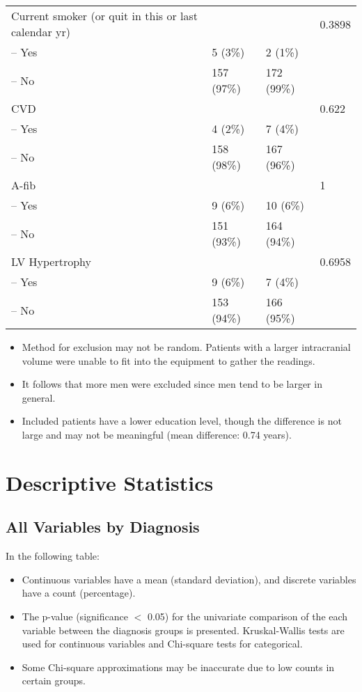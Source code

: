 \documentclass[10pt]{article}\usepackage[]{graphicx}\usepackage[]{color}
\begin{document}
\begin{table}[ht]
\begin{tabular}{llll}
  Current smoker (or quit in this or last calendar yr) &  &  & 0.3898 \\ 
  -- Yes & 5 (3\%) & 2 (1\%) &  \\ 
  -- No & 157 (97\%) & 172 (99\%) &  \\ 
  CVD &  &  & 0.622 \\ 
  -- Yes & 4 (2\%) & 7 (4\%) &  \\ 
  -- No & 158 (98\%) & 167 (96\%) &  \\ 
  A-fib &  &  & 1 \\ 
  -- Yes & 9 (6\%) & 10 (6\%) &  \\ 
  -- No & 151 (93\%) & 164 (94\%) &  \\ 
  LV Hypertrophy &  &  & 0.6958 \\ 
  -- Yes & 9 (6\%) & 7 (4\%) &  \\ 
  -- No & 153 (94\%) & 166 (95\%) &  \\ 
   \bottomrule
\end{tabular}
\end{table}


\begin{itemize}
  \item Method for exclusion may not be random. Patients with a larger intracranial volume were unable to fit into the equipment to gather the readings. 
  \item It follows that more men were excluded since men tend to be larger in general.
  \item Included patients have a lower education level, though the difference is not large and may not be meaningful (mean difference: 0.74 years).
\end{itemize}

\clearpage

\section{Descriptive Statistics}
\subsection{All Variables by Diagnosis}
In the following table:
\begin{itemize}
  \item Continuous variables have a mean (standard deviation), and discrete variables have a count (percentage). 
  \item The p-value (significance $<$ 0.05) for the univariate comparison of the each variable between the diagnosis groups is presented. Kruskal-Wallis tests are used for continuous variables and Chi-square tests for categorical.
  \item Some Chi-square approximations may be inaccurate due to low counts in certain groups.
\end{itemize}
\end{document}
